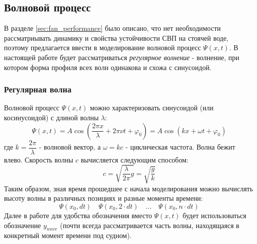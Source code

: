 \begin{centering}
    \subsection{Волновой процесс}
\end{centering}

В разделе \ref{sec:fan_performance} было описано, что нет необходимости рассматриывать динамику и свойства устойчивости СВП на стоячей воде, поэтому предлагается ввести в моделирование волновой процесс $\Psi(x, t)$. В настоящей работе будет рассматриваться {\it регулярное волнение} - волнение, при котором форма профиля всех волн одинакова и схожа с синусоидой.

\begin{centering}
    \subsubsection{Регулярная волна}
\end{centering}

Волновой процесс $\Psi(x, t)$ можно характеризовать синусоидой (или косинусоидой) с длиной волны $\lambda$:
\begin{equation}
    \Psi(x, t) = A \cos(\dfrac{2\pi x}{\lambda}+2\pi \nu t + \varphi_0) = A \cos(kx + \omega t + \varphi_0)
\end{equation}
где $k=\dfrac{2\pi}{\lambda}$ - волновой вектор, а $\omega=kc$ - циклическая частота. Волна бежит влево. Скорость волны $c$ вычисляется следующим способом:
\begin{equation}
    c = \sqrt{\frac{\lambda}{2\pi}g}=\sqrt{\dfrac{g}{k}}
\end{equation}
Таким образом, зная время прошедшее с начала моделирования можно вычислять высоту волны в различных позициях и разные моменты времени:
\begin{equation*}
    \Psi(x_0, dt) \quad \Psi(x_0, 2 \cdot dt) \quad \dots \quad \Psi(x_0, n \cdot dt) 
\end{equation*}
Далее в работе для удобства обозначения вместо $\Psi(x, t)$ будет использоваться обозначение $y_{wave}$ (почти всегда рассматривается часть волны, находящаяся в конкретный момент времени под судном).